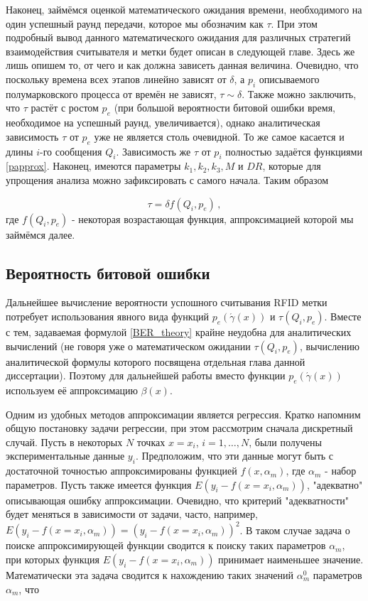 \documentclass[12pt]{article}
\theoremstyle{definition}
\begin{document}
Наконец, займёмся оценкой математического ожидания времени, необходимого на один успешный раунд передачи, которое мы обозначим как $\tau$. При этом подробный вывод данного математического ожидания для различных стратегий взаимодействия считывателя и метки будет описан в следующей главе. Здесь же лишь опишем то, от чего и как должна зависеть данная величина. Очевидно, что поскольку времена всех этапов линейно зависят от $\delta$, а $p_i$ описываемого полумарковского процесса от времён не зависят, $\tau\sim\delta$. Также можно заключить, что $\tau$ растёт с ростом $p_e$ (при большой вероятности битовой ошибки время, необходимое на успешный раунд, увеличивается), однако аналитическая зависимость $\tau$ от $p_e$ уже не является столь очевидной. То же самое касается и длины $i$-го сообщения $Q_i$. Зависимость же $\tau$ от $p_i$ полностью задаётся функциями \eqref{papprox}. Наконец, имеются параметры $k_1,k_2,k_3,M$ и $DR$, которые для упрощения анализа можно зафиксировать с самого начала. Таким образом

\begin{equation}
\label{tau-pre-approx}
    \tau = \delta f(Q_i,p_e)\,,
\end{equation}
где $f(Q_i,p_e)$ - некоторая возрастающая функция, аппроксимацией которой мы займёмся далее.


\subsection{Вероятность битовой ошибки}
\label{sec:ch23}

Дальнейшее вычисление вероятности успошного считывания RFID метки потребует использования явного вида функций $p_e(\acute{\gamma}(x))$ и $\tau(Q_i,p_e)$. Вместе с тем, задаваемая формулой \eqref{BER_theory} крайне неудобна для аналитических вычислений (не говоря уже о математическом ожидании $\tau(Q_i,p_e)$, вычислению аналитической формулы которого посвящена отдельная глава данной диссертации). Поэтому для дальнейшей работы вместо функции $p_e(\acute{\gamma}(x))$ используем её аппроксимацию $\beta(x)$.

Одним из удобных методов аппроксимации является регрессия. Кратко напомним общую постановку задачи регрессии, при этом рассмотрим сначала дискретный случай. Пусть в некоторых $N$ точках $x=x_i$, $i=1,\ldots, N$, были получены экспериментальные данные $y_i$. Предположим, что эти данные могут быть с достаточной точностью аппроксимированы функцией $f(x,\alpha_m)$, где $\alpha_m$ - набор параметров. Пусть также имеется функция $E(y_i - f(x=x_i,\alpha_m))$, "адекватно" описывающая ошибку аппроксимации. Очевидно, что критерий "адекватности" будет меняться в зависимости от задачи, часто, например, $E(y_i - f(x=x_i,\alpha_m)) = (y_i - f(x=x_i,\alpha_m))^2$. В таком случае задача о поиске аппроксимирующей функции сводится к поиску таких параметров $\alpha_m$, при которых функция $E(y_i - f(x=x_i,\alpha_m))$ принимает наименьшее значение. Математически эта задача сводится к нахождению таких значений $\alpha_m^0$ параметров $\alpha_m$, что
\end{document}
